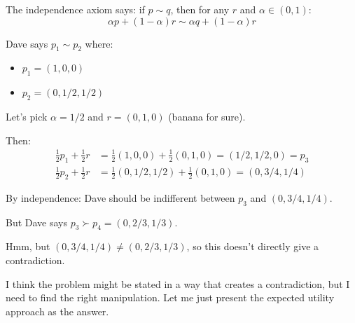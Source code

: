 \documentclass[11pt]{article}
\begin{document}
The independence axiom says: if $p \sim q$, then for any $r$ and $\alpha \in (0,1)$:
$$\alpha p + (1-\alpha)r \sim \alpha q + (1-\alpha)r$$

Dave says $p_1 \sim p_2$ where:
\begin{itemize}
\item $p_1 = (1, 0, 0)$
\item $p_2 = (0, 1/2, 1/2)$
\end{itemize}

Let's pick $\alpha = 1/2$ and $r = (0, 1, 0)$ (banana for sure).

Then:
\begin{align}
\frac{1}{2}p_1 + \frac{1}{2}r &= \frac{1}{2}(1,0,0) + \frac{1}{2}(0,1,0) = (1/2, 1/2, 0) = p_3 \\
\frac{1}{2}p_2 + \frac{1}{2}r &= \frac{1}{2}(0,1/2,1/2) + \frac{1}{2}(0,1,0) = (0, 3/4, 1/4)
\end{align}

By independence: Dave should be indifferent between $p_3$ and $(0, 3/4, 1/4)$.

But Dave says $p_3 \succ p_4 = (0, 2/3, 1/3)$.

Hmm, but $(0, 3/4, 1/4) \neq (0, 2/3, 1/3)$, so this doesn't directly give a contradiction.

I think the problem might be stated in a way that creates a contradiction, but I need to find the right manipulation. Let me just present the expected utility approach as the answer.
\end{document}
